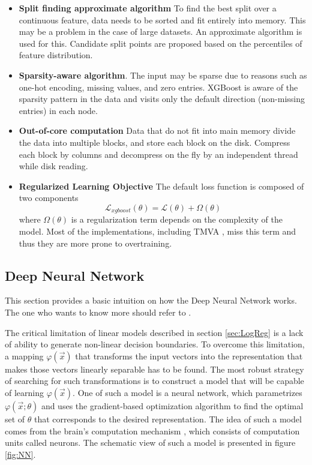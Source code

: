 \begin{itemize}
    \item \textbf{Split finding approximate algorithm} To find the best split over a continuous feature, data needs to be sorted and fit entirely into memory. This may be a problem in the case of large datasets.
    An approximate algorithm is used for this. Candidate split points are proposed based on the percentiles of feature distribution.
    \item  \textbf{Sparsity-aware algorithm}. The input may be sparse due to reasons such as one-hot encoding, missing values, and zero entries. XGBoost is aware of the sparsity pattern in the data and visits only the default direction (non-missing entries) in each node.
    \item  \textbf{Out-of-core computation} 
    Data that do not fit into main memory divide the data into multiple blocks, and store each block on the disk. Compress each block by columns and decompress on the fly by an independent thread while disk reading.
    \item \textbf{Regularized Learning Objective} The default loss function is composed of two components 
    \begin{equation}
        \mathcal{L}_{xgboost}(\theta) = \mathcal{L}(\theta) + \Omega(\theta)
    \end{equation}
    where $\Omega(\theta)$ is a  regularization term depends on the complexity of the model. Most of the implementations, including TMVA \cite{tmva}, miss this term and thus they are more prone to overtraining. 
\end{itemize}


\subsection{Deep Neural Network}
\label{sec:DNN}
This section provides a basic intuition on how the Deep Neural Network works. The one who wants to know more should refer to \cite{DLBook}.  

The critical limitation of linear models described in section \ref{sec:LogReg} is a lack of ability to generate non-linear decision boundaries. To overcome this limitation, a mapping $\varphi(\vec{x})$ that transforms the input vectors into the representation that makes those vectors linearly separable has to be found. The most robust strategy of searching for such transformations is to construct a model that will be capable of learning $\varphi(\vec{x})$. One of such a model is a neural network, which parametrizes $\varphi(\vec{x};\theta)$ and uses the gradient-based optimization algorithm to find the optimal set of $\theta$ that corresponds to the desired representation. The idea of such a model comes from the brain's computation mechanism \cite{NN_brain}, which consists of computation units called neurons. The schematic view of such a model is presented in figure \ref{fig:NN}. 

